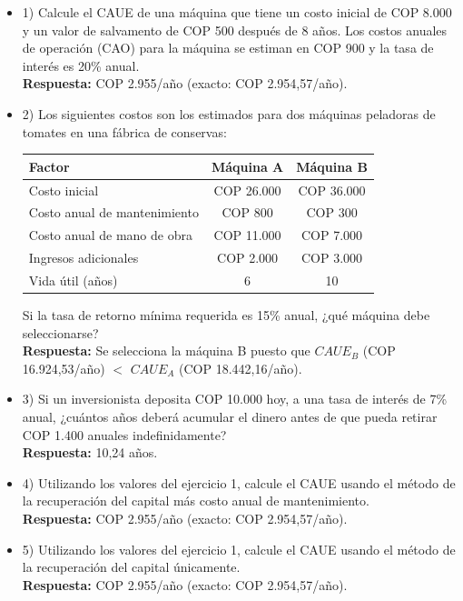 \begin{itemize}

 \item 1) Calcule el CAUE de una máquina que tiene un costo inicial de COP 8.000 y un valor de salvamento de COP 500 después de 8 años. Los costos anuales de operación (CAO) para la máquina se estiman en COP 900 y la tasa de interés es 20\% anual.\\
       \textbf{Respuesta:} COP 2.955/año (exacto: COP 2.954,57/año).
       \medskip

 \item 2) Los siguientes costos son los estimados para dos máquinas peladoras de tomates en una fábrica de conservas:

       \begin{center}
        \renewcommand{\arraystretch}{1.2}
        \begin{tabular}{|l|c|c|}
         \hline
         \rowcolor[HTML]{FFB183}
         \textbf{Factor} & \textbf{Máquina A} & \textbf{Máquina B} \\ \hline
         Costo inicial                & COP 26.000         & COP 36.000         \\ \hline
         Costo anual de mantenimiento & COP 800            & COP 300            \\ \hline
         Costo anual de mano de obra  & COP 11.000         & COP 7.000          \\ \hline
         Ingresos adicionales         & COP 2.000          & COP 3.000          \\ \hline
         Vida útil (años)             & 6                  & 10                 \\ \hline
        \end{tabular}
       \end{center}

       Si la tasa de retorno mínima requerida es 15\% anual, ¿qué máquina debe seleccionarse?\\
       \textbf{Respuesta:} Se selecciona la máquina B puesto que $CAUE_B$ (COP 16.924,53/año) $<$ $CAUE_A$ (COP 18.442,16/año).
       \medskip

 \item 3) Si un inversionista deposita COP 10.000 hoy, a una tasa de interés de 7\% anual, ¿cuántos años deberá acumular el dinero antes de que pueda retirar COP 1.400 anuales indefinidamente?\\
       \textbf{Respuesta:} 10,24 años.
       \medskip

 \item 4) Utilizando los valores del ejercicio 1, calcule el CAUE usando el método de la recuperación del capital más costo anual de mantenimiento.\\
       \textbf{Respuesta:} COP 2.955/año (exacto: COP 2.954,57/año).
       \medskip

 \item 5) Utilizando los valores del ejercicio 1, calcule el CAUE usando el método de la recuperación del capital únicamente.\\
       \textbf{Respuesta:} COP 2.955/año (exacto: COP 2.954,57/año).
       \medskip

\end{itemize}

